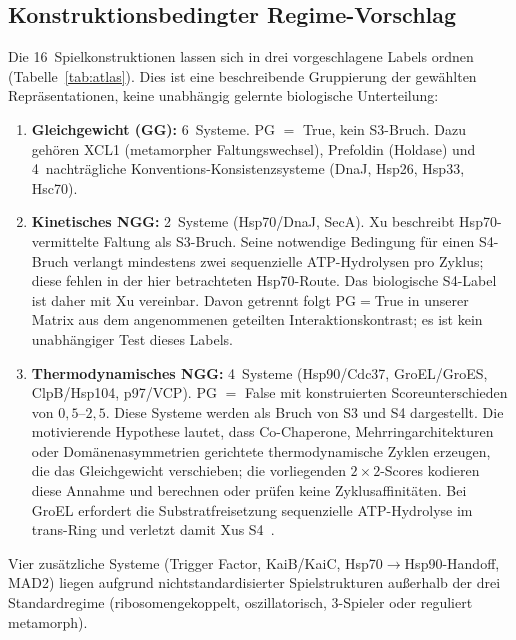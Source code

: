 \documentclass[12pt,a4paper]{article}
\begin{document}
\subsection{Konstruktionsbedingter Regime-Vorschlag}
\label{sec:regime_trinity}

Die 16~Spielkonstruktionen lassen sich in drei vorgeschlagene Labels
ordnen (Tabelle~\ref{tab:atlas}). Dies ist eine beschreibende Gruppierung
der gewählten Repräsentationen, keine unabhängig gelernte biologische
Unterteilung:

\begin{enumerate}
  \item \textbf{Gleichgewicht (GG):} 6~Systeme. PG $=$ True, kein
    S3-Bruch. Dazu gehören XCL1 (metamorpher Faltungswechsel),
    Prefoldin (Holdase) und 4~nachträgliche
    Konventions-Konsistenzsysteme (DnaJ, Hsp26, Hsp33, Hsc70).

  \item \textbf{Kinetisches NGG:} 2~Systeme (Hsp70/DnaJ, SecA).
    Xu beschreibt Hsp70-vermittelte Faltung als S3-Bruch. Seine
    notwendige Bedingung für einen S4-Bruch verlangt mindestens zwei
    sequenzielle ATP-Hydrolysen pro Zyklus; diese fehlen in der hier
    betrachteten Hsp70-Route. Das biologische S4-Label ist daher mit Xu
    vereinbar. Davon getrennt folgt PG$=$True in unserer Matrix aus dem
    angenommenen geteilten Interaktionskontrast; es ist kein
    unabhängiger Test dieses Labels.

  \item \textbf{Thermodynamisches NGG:} 4~Systeme (Hsp90/Cdc37,
    GroEL/GroES, ClpB/Hsp104, p97/VCP). PG $=$ False mit konstruierten
    Scoreunterschieden von $0{,}5$--$2{,}5$. Diese Systeme werden als Bruch von S3 und S4 dargestellt. Die
    motivierende Hypothese lautet, dass Co-Chaperone, Mehrringarchitekturen
    oder Domänenasymmetrien gerichtete thermodynamische Zyklen erzeugen, die
    das Gleichgewicht verschieben; die vorliegenden $2\times 2$-Scores
    kodieren diese Annahme und berechnen oder prüfen keine Zyklusaffinitäten. Bei GroEL erfordert die
    Substratfreisetzung sequenzielle ATP-Hydrolyse im trans-Ring und
    verletzt damit Xus S4~\cite{Xu2022}.
\end{enumerate}

Vier zusätzliche Systeme (Trigger Factor, KaiB/KaiC, Hsp70$\to$Hsp90-Handoff,
MAD2) liegen aufgrund nichtstandardisierter Spielstrukturen
außerhalb der drei Standardregime (ribosomengekoppelt, oszillatorisch,
3-Spieler oder reguliert metamorph).
\end{document}
